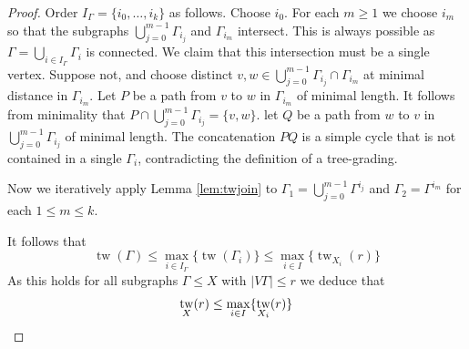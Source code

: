 \documentclass[10pt,a4paper]{amsart}
\DeclareMathOperator{\tw}{tw}
\begin{document}
\begin{proof}
    Order $I_\Gamma=\{i_0,\ldots,i_k\}$ as follows. Choose $i_0$. For each $m\geq 1$ we choose $i_m$ so that the subgraphs $\bigcup_{j=0}^{m-1} \Gamma_{i_j}$ and $\Gamma_{i_m}$ intersect. This is always possible as $\Gamma=\bigcup_{i\in I_\Gamma} \Gamma_i$ is connected. We claim that this intersection must be a single vertex. Suppose not, and choose distinct $v,w\in \bigcup_{j=0}^{m-1} \Gamma_{i_j}\cap\Gamma_{i_m}$ at minimal distance in $\Gamma_{i_m}$. Let $P$ be a path from $v$ to $w$ in $\Gamma_{i_m}$ of minimal length. It follows from minimality that $P\cap \bigcup_{j=0}^{m-1} \Gamma_{i_j}=\{v,w\}$. let $Q$ be a path from $w$ to $v$ in $\bigcup_{j=0}^{m-1} \Gamma_{i_j}$ of minimal length. The concatenation $PQ$ is a simple cycle that is not contained in a single $\Gamma_i$, contradicting the definition of a tree-grading.
    
    Now we iteratively apply Lemma \ref{lem:twjoin} to $\Gamma_1=\bigcup_{j=0}^{m-1} \Gamma^{i_j}$ and $\Gamma_2=\Gamma^{i_{m}}$ for each $1\leq m\leq k$.

    It follows that
    \[
        \tw(\Gamma) \leq \max_{i\in I_\Gamma} \{\tw(\Gamma_i)\} \leq \max_{i\in I} \{\tw_{X_i}(r)\}
    \]
    As this holds for all subgraphs $\Gamma\leq X$ with $|V\Gamma|\leq r$ we deduce that
    \[
        \tw_X(r) \leq \max_{i\in I} \{\tw_{X_i}(r)\}  \qedhere
    \]
\end{proof}
\end{document}

